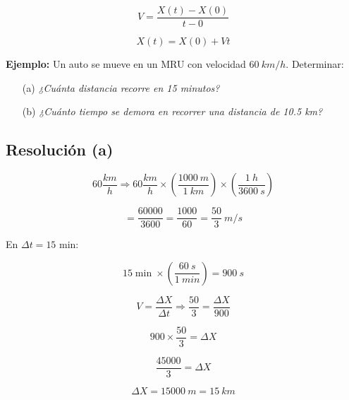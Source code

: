 \begin{equation}
V = \frac{X(t) - X(0)}{t - 0}
\end{equation}

\begin{equation}
X(t) = X(0) + Vt
\end{equation}

\textbf{Ejemplo:} Un auto se mueve en un MRU con velocidad $60 \ km/h$. Determinar:

\begin{itemize}
    \item[(a)] \textit{¿Cuánta distancia recorre en 15 minutos?}
    \item[(b)] \textit{¿Cuánto tiempo se demora en recorrer una distancia de 10.5 km?}
\end{itemize}

\subsection{Resolución (a)}

\begin{equation}
60 \frac{km}{h} \Rightarrow 60 \frac{km}{h} \times \left( \frac{1000 \ m}{1 \ km} \right) \times \left( \frac{1 \ h}{3600 \ s} \right)
\end{equation}

\begin{equation}
= \frac{60000}{3600} = \frac{1000}{60} = \frac{50}{3} \ m/s
\end{equation}

En $\Delta t = 15$ min:

\begin{equation}
15 \min \times \left( \frac{60 \ s}{1 \ min} \right) = 900 \ s
\end{equation}

\begin{equation}
V = \frac{\Delta X}{\Delta t} \Rightarrow \frac{50}{3} = \frac{\Delta X}{900}
\end{equation}

\begin{equation}
900 \times \frac{50}{3} = \Delta X
\end{equation}

\begin{equation}
\frac{45000}{3} = \Delta X
\end{equation}

\begin{equation}
\Delta X = 15000 \ m = 15 \ km
\end{equation}

